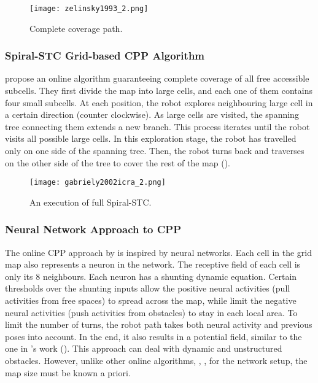 \begin{figure}[!htb]
	\centering
	\texttt{[image: zelinsky1993\_2.png]}
	\caption{Complete coverage path.}
	\label{fig:zelinsky1993_2}
\end{figure}

\subsubsection{Spiral-STC Grid-based \ac{CPP} Algorithm}
 propose an online algorithm guaranteeing complete coverage of all free accessible subcells. They first divide the map into large cells, and each one of them contains four small subcells. At each position, the robot explores neighbouring large cell in a certain direction (counter clockwise). As large cells are visited, the spanning tree connecting them extends a new branch. This process iterates until the robot visits all possible large cells. In this exploration stage, the robot has travelled only on one side of the spanning tree. Then, the robot turns back and traverses on the other side of the tree to cover the rest of the map ().

\begin{figure}[!htb]
	\centering
	\texttt{[image: gabriely2002icra\_2.png]}
	\caption{An execution of full Spiral-STC.}
	\label{fig:gabriely2002icra_2}
\end{figure}

\subsubsection{Neural Network Approach to CPP}
The online \ac{CPP} approach by  is inspired by neural networks. Each cell in the grid map also represents a neuron in the network. The receptive field of each cell is only its 8 neighbours. Each neuron has a shunting dynamic equation. Certain thresholds over the shunting inputs allow the positive neural activities (pull activities from free spaces) to spread across the map, while limit the negative neural activities (push activities from obstacles) to stay in each local area. To limit the number of turns, the robot path takes both neural activity and previous poses into account. In the end, it also results in a potential field, similar to the one in \citeauthor*{zelinsky1993icar}'s work (). This approach can deal with dynamic and unstructured obstacles. However, unlike other online algorithms, \eg, \cite{butler2000, acar2001iros, gabriely2002icra}, for the network setup, the map size must be known a priori.

